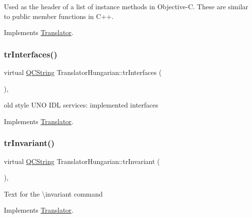 Used as the header of a list of instance methods in Objective-\/C. These are similar to public member functions in C++. 

Implements \mbox{\hyperlink{class_translator}{Translator}}.

\mbox{\label{class_translator_hungarian_aa9b8066f27b8cbec0b55e9c82da74d44}} 
\subsubsection{\texorpdfstring{trInterfaces()}{trInterfaces()}}
{\footnotesize\ttfamily virtual \mbox{\hyperlink{class_q_c_string}{Q\+C\+String}} Translator\+Hungarian\+::tr\+Interfaces (\begin{DoxyParamCaption}{ }\end{DoxyParamCaption})\hspace{0.3cm}{\ttfamily [inline]}, {\ttfamily [virtual]}}

old style U\+NO I\+DL services\+: implemented interfaces 

Implements \mbox{\hyperlink{class_translator}{Translator}}.

\mbox{\label{class_translator_hungarian_afddeffed9bdcd1d0b50b362510ad5de3}} 
\subsubsection{\texorpdfstring{trInvariant()}{trInvariant()}}
{\footnotesize\ttfamily virtual \mbox{\hyperlink{class_q_c_string}{Q\+C\+String}} Translator\+Hungarian\+::tr\+Invariant (\begin{DoxyParamCaption}{ }\end{DoxyParamCaption})\hspace{0.3cm}{\ttfamily [inline]}, {\ttfamily [virtual]}}

Text for the \textbackslash{}invariant command 

Implements \mbox{\hyperlink{class_translator}{Translator}}.

\mbox{\label{class_translator_hungarian_a7d44ba57f828e96ed8315cc6b4ac35f6}} 
